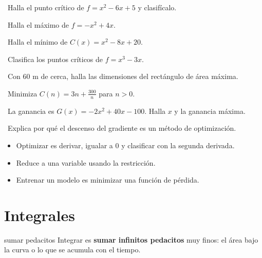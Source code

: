 \begin{tmejercicios}
\label{ej:4-4}
\begin{tmlista}
\item \tmbasico\ Halla el punto cr\'itico de $f=x^2-6x+5$ y clasif\'icalo.
\item \tmbasico\ Halla el m\'aximo de $f=-x^2+4x$.
\item \tmbasico\ Halla el m\'inimo de $C(x)=x^2-8x+20$.
\item \tmmedio\ Clasifica los puntos cr\'iticos de $f=x^3-3x$.
\item \tmmedio\ Con 60 m de cerca, halla las dimensiones del rect\'angulo de \'area m\'axima.
\item \tmmedio\ Minimiza $C(n)=3n+\frac{300}n$ para $n>0$.
\item \tmdificil\ La ganancia es $G(x)=-2x^2+40x-100$. Halla $x$ y la ganancia m\'axima.
\item \tmdificil\ Explica por qu\'e el descenso del gradiente es un m\'etodo de optimizaci\'on.
\end{tmlista}
\end{tmejercicios}


\begin{tmresumen}
\begin{itemize}
\item Optimizar es derivar, igualar a 0 y clasificar con la segunda derivada.
\item Reduce a una variable usando la restricci\'on.
\item Entrenar un modelo es minimizar una funci\'on de p\'erdida.
\end{itemize}
\end{tmresumen}

\section{Integrales}
\label{sec:4-5}

\begin{tmconcepto}{sumar pedacitos}
Integrar es \textbf{sumar infinitos pedacitos} muy finos: el \'area bajo la curva o lo que se acumula con el tiempo.
\end{tmconcepto}

